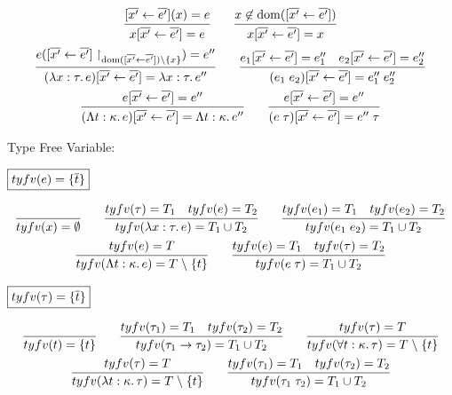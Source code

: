 \begin{gather*}
  \infer{x[\overline{x'} \assign \overline{e'}] = e}{
    [\overline{x'} \assign \overline{e'}](x) = e
  }
  \hspace{2em}
  \infer{x[\overline{x'} \assign \overline{e'}]= x}{
    x \not\in \dom([\overline{x'} \assign \overline{e'}])
  }
  \\
  \infer{(\lambda x: \tau\ldotp e)[\overline{x'} \assign \overline{e'}] = \lambda x: \tau\ldotp e''}{
    e([\overline{x'} \assign \overline{e'}]\restrict_{\dom([\overline{x'} \assign \overline{e'}]) \rcomplement \{x\}}) = e''
  }
  \hspace{2em}
  \infer{(e_1\; e_2)[\overline{x'} \assign \overline{e'}] = e''_1\; e''_2}{
    e_1[\overline{x'} \assign \overline{e'}] = e''_1
    &
    e_2[\overline{x'} \assign \overline{e'}] = e''_2
  }
  \\
  \infer{(\Lambda t: \kappa\ldotp e)[\overline{x'} \assign \overline{e'}] = \Lambda t: \kappa\ldotp e''}{
    e[\overline{x'} \assign \overline{e'}] = e''
  }
  \hspace{2em}
  \infer{(e\; \tau)[\overline{x'} \assign \overline{e'}] = e''\; \tau}{
    e[\overline{x'} \assign \overline{e'}] = e''
  }
\end{gather*}

Type Free Variable:

$\fbox{$\mathop{tyfv}(e) = \{\overline{t}\}$}$

\begin{gather*}
  \infer{\typefreevar(x) = \emptyset}{}
  \hspace{2em}
  \infer{\typefreevar(\lambda x: \tau\ldotp e) = T_1 \cup T_2}{
    \typefreevar(\tau) = T_1
    &
    \typefreevar(e) = T_2
  }
  \hspace{2em}
  \infer{\typefreevar(e_1\; e_2) = T_1 \cup T_2}{
    \typefreevar(e_1) = T_1
    &
    \typefreevar(e_2) = T_2
  }
  \\
  \infer{\typefreevar(\Lambda t: \kappa\ldotp e) = T \rcomplement \{t\}}{
    \typefreevar(e) = T
  }
  \hspace{2em}
  \infer{\typefreevar(e\; \tau) = T_1 \cup T_2}{
    \typefreevar(e) = T_1
    &
    \typefreevar(\tau) = T_2
  }
\end{gather*}

$\fbox{$\mathop{tyfv}(\tau) = \{\overline{t}\}$}$

\begin{gather*}
  \infer{\typefreevar(t) = \{t\}}{}
  \hspace{2em}
  \infer{\typefreevar(\tau_1 \to \tau_2) = T_1 \cup T_2}{
    \typefreevar(\tau_1) = T_1
    &
    \typefreevar(\tau_2) = T_2
  }
  \hspace{2em}
  \infer{\typefreevar(\forall t: \kappa\ldotp \tau) = T \rcomplement \{t\}}{
    \typefreevar(\tau) = T
  }
  \\
  \infer{\typefreevar(\lambda t: \kappa\ldotp \tau) = T \rcomplement \{t\}}{
    \typefreevar(\tau) = T
  }
  \hspace{2em}
  \infer{\typefreevar(\tau_1\; \tau_2) = T_1 \cup T_2}{
    \typefreevar(\tau_1) = T_1
    &
    \typefreevar(\tau_2) = T_2
  }
\end{gather*}

